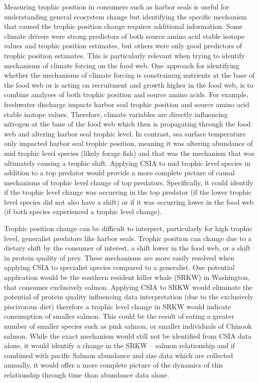 \documentclass [11pt, proquest] {uwthesis}[2015/03/03]
\begin{document}
Measuring trophic position in consumers such as harbor seals is useful
for understanding general ecosystem change but identifying the specific
mechanism that caused the trophic position change requires additional
information. Some climate drivers were strong predictors of both source
amino acid stable isotope values and trophic position estimates, but
others were only good predictors of trophic position estimates. This is
particularly relevant when trying to identify mechanisms of climate
forcing on the food web. One approach for identifying whether the
mechanisms of climate forcing is constraining nutrients at the base of
the food web or is acting on recruitment and growth higher in the food
web, is to combine analyses of both trophic position and source amino
acids. For example, freshwater discharge impacts harbor seal trophic
position and source amino acid stable isotope values. Therefore, climate
variables are directly influencing nitrogen at the base of the food web
which then is propagating through the food web and altering harbor seal
trophic level. In contrast, sea surface temperature only impacted harbor
seal trophic position, meaning it was altering abundance of mid trophic
level species (likely forage fish) and that was the mechanism that was
ultimately causing a trophic shift. Applying CSIA to mid trophic level
species in addition to a top predator would provide a more complete
picture of causal mechanisms of trophic level change of top predators.
Specifically, it could identify if the trophic level change was
occurring in the top predator (if the lower trophic level species did
not also have a shift) or if it was occurring lower in the food web (if
both species experienced a trophic level change).

Trophic position change can be difficult to interpret, particularly for
high trophic level, generalist predators like harbor seals. Trophic
position can change due to a dietary shift by the consumer of interest,
a shift lower in the food web, or a shift in protein quality of prey.
These mechanisms are more easily resolved when applying CSIA to
specialist species compared to a generalist. One potential application
would be the southern resident killer whale (SRKW) in Washington, that
consumes exclusively salmon. Applying CSIA to SRKW would eliminate the
potential of protein quality influencing data interpretation (due to the
exclusively piscivorous diet) therefore a trophic level change in SRKW
would indicate consumption of smaller salmon. This could be the result
of eating a greater number of smaller species such as pink salmon, or
smaller individuals of Chinook salmon. While the exact mechanism would
still not be identified from CSIA data alone, it would identify a change
in the SRKW -- salmon relationship and if combined with pacific Salmon
abundance and size data which are collected annually, it would offer a
more complete picture of the dynamics of this relationship through time
than abundance data alone.
\end{document}
